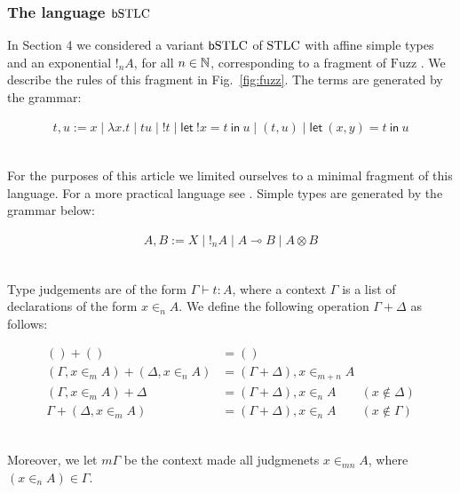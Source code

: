 
\subsubsection{The language $\mathsf b\mathrm{STLC}$}
In Section 4 we considered a variant $\mathsf b\mathrm{STLC}$ of $\mathrm{STLC}$ with affine simple types and an exponential $!_{n}A$, for all $n\in \mathbb{N}$, corresponding to a fragment of $\mathrm{Fuzz}$ \cite{Reed2010}. 
We describe the rules of this fragment in Fig.~\ref{fig:fuzz}.
The terms are generated by the grammar:

{
\begin{minipage}{\textwidth}
\begin{align*}
t,u:= x\mid \lambda x.t\mid tu \mid !t \mid \mathsf{let}\  !x=t \ \mathsf{in}\  u\mid (t,u)\mid  \mathsf{let}\  (x,y)=t \ \mathsf{in} \  u 
\end{align*}\end{minipage}}\medskip\\
For the purposes of this article we limited ourselves to a minimal fragment of this language. For a more practical language see \cite{Reed2010,Gaboardi2017}.  
Simple types are generated by the grammar below:

{
\begin{minipage}{\textwidth}
\begin{align*}
A,B:= X\mid  !_{n}A  \mid A\multimap B \mid A\otimes B
\end{align*}\end{minipage}}\medskip\\
Type judgements are of the form $\Gamma \vdash t:A$, where a context $\Gamma$ is a list of declarations of the form $x\in_{n}A$.
We define the following operation $\Gamma+\Delta$  as follows:

{
\begin{minipage}{\textwidth}
\begin{align*}
() + () & =() \\
(\Gamma, x\in_{m} A)+( \Delta, x\in_{n} A) & =  (\Gamma+\Delta), x\in_{m+n}A \\
(\Gamma, x\in_{m}A)+\Delta & =(\Gamma+\Delta), x\in_{n}A \qquad (x\notin \Delta) \\
\Gamma+ (\Delta, x\in_{m}A) &= (\Gamma+\Delta), x\in_{n} A \qquad (x\notin \Gamma)
\end{align*}\end{minipage}}\medskip\\
Moreover, we let $m\Gamma$ be the context made all judgmenets $x\in_{mn}A$, where $(x\in_{n}A)\in \Gamma$.  

